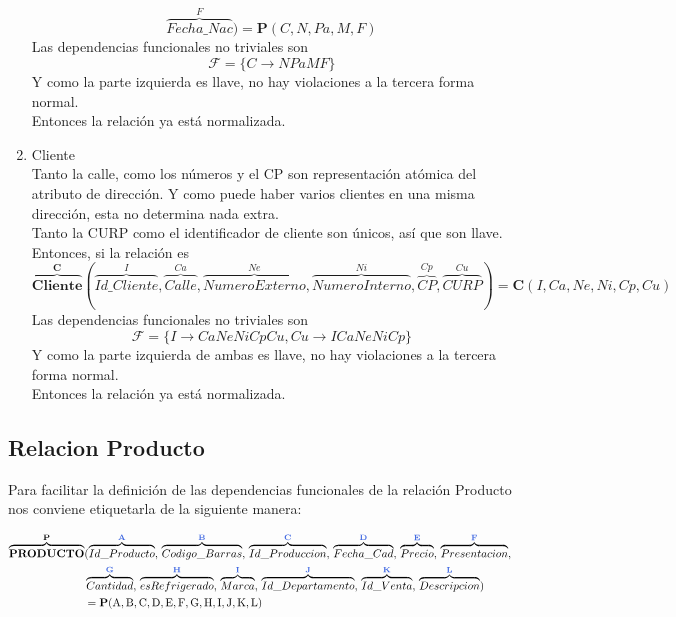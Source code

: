 \documentclass[10pt]{article}
\begin{document}
\begin{enumerate}
\[	   \overbrace{Fecha\_Nac}^{F}
	)
	= 
	\textbf{P}(C, N, Pa, M, F)
	\]
	Las dependencias funcionales no triviales son 
	\[\mathcal{F} = \{C \rightarrow NPaMF\}\]
	Y como la parte izquierda es llave,  no hay violaciones a la tercera forma
	normal.\\
	Entonces la relación ya está normalizada.
	\item Cliente \\
	Tanto la calle, como los números y el CP son representación atómica del
	atributo de dirección. Y como puede haber varios clientes en una misma
	dirección, esta no determina nada extra.\\
	Tanto la CURP como el identificador de cliente son únicos, así que son
	llave.\\
	Entonces, si la relación es 
	\[\overbrace{{\textbf{Cliente}}}^{\textbf{C}} 
   (
	   \overbrace{Id\_Cliente}^{I}, \overbrace{Calle}^{Ca}, 
	   \overbrace{Numero Externo}^{Ne}, \overbrace{Numero Interno}^{Ni},
	   \overbrace{CP}^{Cp}, \overbrace{CURP}^{Cu}
	)
	= 
	\textbf{C}(I, Ca, Ne, Ni, Cp, Cu)
	\]
	Las dependencias funcionales no triviales son 
	\[\mathcal{F} = \{I \rightarrow CaNeNiCpCu, Cu \rightarrow ICaNeNiCp\}\]
	Y como la parte izquierda de ambas es llave, no hay violaciones a la tercera
	forma normal.\\
	Entonces la relación ya está normalizada.
\end{enumerate}

\subsection{Relacion Producto}




Para facilitar la definición de las dependencias funcionales de la relación Producto nos conviene etiquetarla de la siguiente manera:

\begin{align*}
\overbrace{ \textbf{PRODUCTO}}^{\textbf{{P}}}&(\overbrace{ Id\_Producto}^{\textbf{\textcolor{RoyalBlue}{A}}},\,\overbrace{Codigo\_Barras}^{\textbf{\textcolor{RoyalBlue}{B}}},\,\overbrace{Id\_Produccion}^{\textbf{\textcolor{RoyalBlue}{C}}},\,\overbrace{Fecha\_Cad}^{\textbf{\textcolor{RoyalBlue}{D}}},\,\overbrace{Precio}^{\textbf{\textcolor{RoyalBlue}{E}}},\,\overbrace{Presentacion}^{\textbf{\textcolor{RoyalBlue}{F}}},\\&\overbrace{Cantidad}^{\textbf{\textcolor{RoyalBlue}{G}}},\,\overbrace{esRefrigerado}^{\textbf{\textcolor{RoyalBlue}{H}}},\,\overbrace{Marca}^{\textbf{\textcolor{RoyalBlue}{I}}},\,\overbrace{Id\_Departamento}^{\textbf{\textcolor{RoyalBlue}{J}}},\,\overbrace{Id\_Venta}^{\textbf{\textcolor{RoyalBlue}{K}}},\,\overbrace{Descripcion}^{\textbf{\textcolor{RoyalBlue}{L}}})\\
&= \textbf{P}(\mathrm{A,B,C,D,E,F,G,H,I,J,K,L})
\end{align*}
\end{document}
